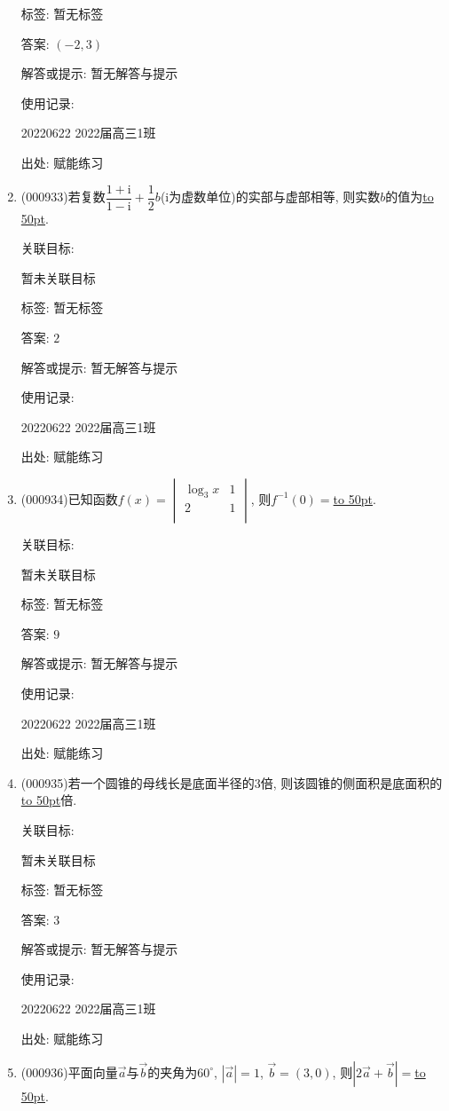\documentclass[10pt,a4paper]{article}
\newcommand{\blank}[1]{\underline{\hbox to #1pt{}}}
\begin{document}
\begin{enumerate}[1.]
标签: 暂无标签

答案: $(-2,3)$

解答或提示: 暂无解答与提示

使用记录:

20220622	2022届高三1班	


出处: 赋能练习
\item { (000933)}若复数$\dfrac{1+\mathrm{i}}{1-\mathrm{i}}+\dfrac12b$($\mathrm{i}$为虚数单位)的实部与虚部相等, 则实数$b$的值为\blank{50}.


关联目标:

暂未关联目标



标签: 暂无标签

答案: $2$

解答或提示: 暂无解答与提示

使用记录:

20220622	2022届高三1班	


出处: 赋能练习
\item { (000934)}已知函数$f(x)=\begin{vmatrix}   {\log _3}x & 1  \\   2 & 1  \\\end{vmatrix}$, 则$f^{-1}(0)=$\blank{50}.


关联目标:

暂未关联目标



标签: 暂无标签

答案: $9$

解答或提示: 暂无解答与提示

使用记录:

20220622	2022届高三1班	


出处: 赋能练习
\item { (000935)}若一个圆锥的母线长是底面半径的$3$倍, 则该圆锥的侧面积是底面积的\blank{50}倍.


关联目标:

暂未关联目标



标签: 暂无标签

答案: $3$

解答或提示: 暂无解答与提示

使用记录:

20220622	2022届高三1班	


出处: 赋能练习
\item { (000936)}平面向量$\overrightarrow a$与$\overrightarrow b$的夹角为$60^\circ$, $|\overrightarrow a|=1$, $\overrightarrow b=(3,0)$, 则$|2 \overrightarrow a+\overrightarrow b|=$\blank{50}.



\end{enumerate}
\end{document}
